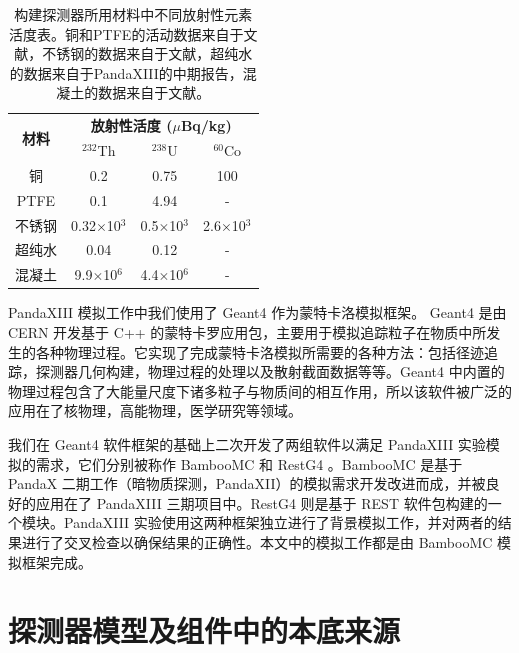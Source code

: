 \renewcommand\arraystretch{1.4}
\begin{table}[tbh]
    \centering
    \begin{tabular*}{0.75\textwidth}{@{\extracolsep{\fill}}cccc}
        \hline
        \hline
        \multirow{2}{*}{\textbf{材料}} & \multicolumn{3}{c}{\textbf{放射性活度 ($\mu$Bq/kg)}}\\
            & $^{232}$Th & $^{238}$U  & $^{60}$Co \\ \hline
        铜      & 0.2        &   0.75     &     100     \\
        PTFE    & 0.1        &   4.94      &    -      \\
        不锈钢  & 0.32$\times$10$^3$          &    0.5$\times$10$^3$      &     2.6$\times$10$^3$     \\
        超纯水  & 0.04          &     0.12      &     -     \\
        混凝土  & 9.9$\times$10$^6$          &    4.4$\times$10$^6$   &    -    \\
        \hline
        \hline
    \end{tabular*}
    \caption{构建探测器所用材料中不同放射性元素活度表。铜和PTFE的活动数据来自于文献\cite{Abgrall:2016cct}，不锈钢的数据来自于文献\cite{LZ_CDR}，超纯水的数据来自于PandaXIII的中期报告\cite{cdr}，混凝土的数据来自于文献\cite{Zeng2014}。}
    \label{tab:activities}
  \end{table}
  

PandaXIII 模拟工作中我们使用了 Geant4 作为蒙特卡洛模拟框架。 Geant4 是由 CERN 开发基于 C++ 的蒙特卡罗应用包，主要用于模拟追踪粒子在物质中所发生的各种物理过程。它实现了完成蒙特卡洛模拟所需要的各种方法：包括径迹追踪，探测器几何构建，物理过程的处理以及散射截面数据等等。Geant4 中内置的物理过程包含了大能量尺度下诸多粒子与物质间的相互作用，所以该软件被广泛的应用在了核物理，高能物理，医学研究等领域。

我们在 Geant4 软件框架的基础上二次开发了两组软件以满足 PandaXIII 实验模拟的需求，它们分别被称作 BambooMC 和 RestG4 。BambooMC 是基于 PandaX 二期工作（暗物质探测，PandaXII）的模拟需求开发改进而成，并被良好的应用在了 PandaXIII 三期项目中。RestG4 则是基于 REST \supercite{tomas2013development} 软件包构建的一个模块。PandaXIII 实验使用这两种框架独立进行了背景模拟工作，并对两者的结果进行了交叉检查以确保结果的正确性。本文中的模拟工作都是由 BambooMC 模拟框架完成。

\section{探测器模型及组件中的本底来源}

